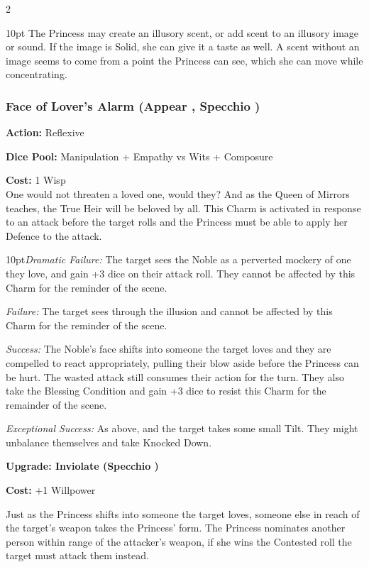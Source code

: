 \begin{multicols}{2}
\begin{myindentpar}{10pt}
The Princess may create an illusory scent, or add scent to an illusory image or sound. If the image is Solid, she can give it a taste as well. A scent without an image seems to come from a point the Princess can see, which she can move while concentrating.


\end{myindentpar}

\subsubsection*{Face of Lover's Alarm (Appear \textbullet\textbullet, Specchio \textbullet\textbullet)}

\noindent \textbf{Action:} Reflexive

\noindent \textbf{Dice Pool:} Manipulation + Empathy vs Wits + Composure

\noindent \textbf{Cost:} 1 Wisp\\

\noindent One would not threaten a loved one, would they? And as the Queen of Mirrors teaches, the True Heir will be beloved by all. This Charm is activated in response to an attack before the target rolls and the Princess must be able to apply her Defence to the attack.

\begin{myindentpar}{10pt}\emph{Dramatic Failure:} The target sees the Noble as a perverted mockery of one they love, and gain +3 dice on their attack roll. They cannot be affected by this Charm for the reminder of the scene.

    \emph{Failure:} The target sees through the illusion and cannot be affected by this Charm for the reminder of the scene.

    \emph{Success:} The Noble's face shifts into someone the target loves and they are compelled to react appropriately, pulling their blow aside before the Princess can be hurt. The wasted attack still consumes their action for the turn. They also take the Blessing Condition and gain +3 dice to resist this Charm for the remainder of the scene. 

    \emph{Exceptional Success:}  As above, and the target takes some small Tilt. They might unbalance themselves and take Knocked Down.  

\textbf{Upgrade: Inviolate (Specchio \textbullet\textbullet\textbullet)}

\noindent \textbf{Cost:} +1 Willpower

Just as the Princess shifts into someone the target loves, someone else in reach of the target's weapon takes the Princess' form. The Princess nominates another person within range of the attacker's weapon, if she wins the Contested roll the target must attack them instead. 


\end{myindentpar}
\end{multicols}
